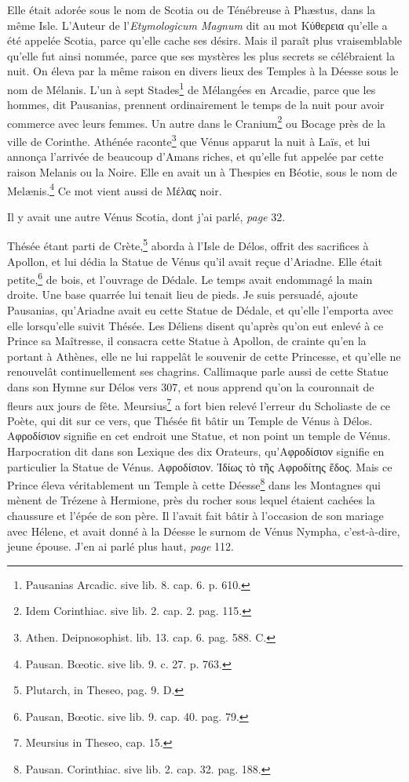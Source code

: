 \documentclass[a4paper, 18pt, oneside]{article}
\begin{document}
Elle était adorée sous le nom de Scotia ou de Ténébreuse à Phæstus, dans la même Isle. L'Auteur de l'\emph{Etymologicum Magnum} dit au mot Κύθερεια qu'elle a été appelée Scotia, parce qu'elle cache ses désirs. Mais il paraît plus vraisemblable qu'elle fut ainsi nommée, parce que ses mystères les plus secrets se célébraient la nuit. On éleva par la même raison en divers lieux des Temples à la Déesse sous le nom de Mélanis. L'un à sept Stades\footnote{Pausanias Arcadic. sive lib. 8. cap. 6. p. 610.} de Mélangées en Arcadie, parce que les hommes, dit Pausanias, prennent ordinairement le temps de la nuit pour avoir commerce avec leurs femmes. Un autre dans le Cranium\footnote{Idem Corinthiac. sive lib. 2. cap. 2. pag. 115.} ou Bocage près de la ville de Corinthe. Athénée raconte\footnote{Athen. Deipnosophist. lib. 13. cap. 6. pag. 588. C.} que Vénus apparut la nuit à Laïs, et lui annonça l'arrivée de beaucoup d'Amans riches, et qu'elle fut appelée par cette raison Melanis ou la Noire. Elle en avait un à Thespies en Béotie, sous le nom de Melænis.\footnote{Pausan. Bœotic. sive lib. 9. c. 27. p. 763.} Ce mot vient aussi de Μέλας noir.

Il y avait une autre Vénus Scotia, dont j'ai parlé, \emph{page} 32.

Thésée étant parti de Crète,\footnote{Plutarch, in Theseo, pag. 9. D.} aborda à l'Isle de Délos, offrit des sacrifices à Apollon, et lui dédia la Statue de Vénus qu'il avait reçue d'Ariadne. Elle était petite,\footnote{Pausan, Bœotic. sive lib. 9. cap. 40. pag. 79.} de bois, et l'ouvrage de Dédale. Le temps avait endommagé la main droite. Une base quarrée lui tenait lieu de pieds. Je suis persuadé, ajoute Pausanias, qu'Ariadne avait eu cette Statue de Dédale, et qu'elle l'emporta avec elle lorsqu'elle suivit Thésée. Les Déliens disent qu'après qu'on eut enlevé à ce Prince sa Maîtresse, il consacra cette Statue à Apollon, de crainte qu'en la portant à Athènes, elle ne lui rappelât le souvenir de cette Princesse, et qu'elle ne renouvelât continuellement ses chagrins. Callimaque parle aussi de cette Statue dans son Hymne sur Délos vers 307, et nous apprend qu'on la couronnait de fleurs aux jours de fête. Meursius\footnote{Meursius in Theseo, cap. 15.} a fort bien relevé l'erreur du Scholiaste de ce Poète, qui dit sur ce vers, que Thésée fit bâtir un Temple de Vénus à Délos. Αφροδίσιον signifie en cet endroit une Statue, et non point un temple de Vénus. Harpocration dit dans son Lexique des dix Orateurs, qu'Αφροδίσιον signifie en particulier la Statue de Vénus. Αφροδίσιον. Ἰδίως τὸ τῆς Αφροδίτης ἕδος. Mais ce Prince éleva véritablement un Temple à cette Déesse\footnote{Pausan. Corinthiac. sive lib. 2. cap. 32. pag. 188.} dans les Montagnes qui mènent de Trézene à Hermione, près du rocher sous lequel étaient cachées la chaussure et l'épée de son père. Il l'avait fait bâtir à l'occasion de son mariage avec Hélene, et avait donné à la Déesse le surnom de Vénus Nympha, c'est-à-dire, jeune épouse. J'en ai parlé plus haut, \emph{page} 112.
\end{document}
